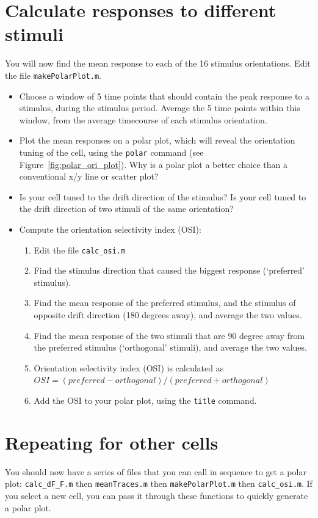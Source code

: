 \documentclass[paper=a4, fontsize=11pt]{scrartcl} %
\numberwithin{equation}{section} %
\numberwithin{figure}{section} %
\numberwithin{table}{section} %
\begin{document}
\section{Calculate responses to different stimuli}
You will now find the mean response to each of the 16 stimulus orientations. Edit the file \texttt{makePolarPlot.m}.
\begin{itemize}
\setlength{\parskip}{0.25em}
\item Choose a window of 5 time points that should contain the peak response to a stimulus, during the stimulus period. Average the 5 time points within this window, from the average timecourse of each stimulus orientation.
\item Plot the mean responses on a polar plot, which will reveal the orientation tuning of the cell, using the \texttt{polar} command (see Figure~\ref{fig:polar_ori_plot}). Why is a polar plot a better choice than a conventional x/y line or scatter plot?
\item Is your cell tuned to the drift direction of the stimulus? Is your cell tuned to the drift direction of two stimuli of the same orientation?
\item Compute the orientation selectivity index (OSI):
    \begin{enumerate}
    \item Edit the file \texttt{calc\_osi.m}
    \item Find the stimulus direction that caused the biggest response (`preferred' stimulus).
    \item Find the mean response of the preferred stimulus, and the stimulus of opposite drift direction (180 degrees away), and average the two values.
    \item Find the mean response of the two stimuli that are 90 degree away from the preferred stimulus (`orthogonal' stimuli), and average the two values.
    \item Orientation selectivity index (OSI) is calculated as \\ $OSI = {\left(preferred - orthogonal\right)} / {\left(preferred + orthogonal\right)}$
    \item Add the OSI to your polar plot, using the \texttt{title} command.
    \end{enumerate}
\end{itemize}

\section{Repeating for other cells}
You should now have a series of files that you can call in sequence to get a polar plot: \texttt{calc\_dF\_F.m} then \texttt{meanTraces.m} then \texttt{makePolarPlot.m} then \texttt{calc\_osi.m}. If you select a new cell, you can pass it through these functions to quickly generate a polar plot. 
\end{document}
